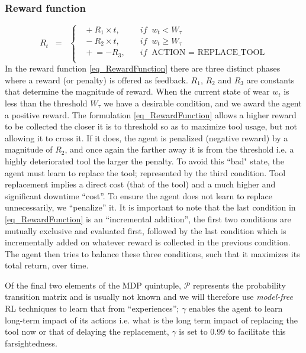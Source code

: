 \documentclass[referee, sn-mathphys-num]{sn-jnl}
\begin{document}
	\subsubsection*{Reward function}
	\begin{equation}
		R_t \;\;=\;\;
		\begin{cases}
			\;\;  +R_1 \times t, & \quad if \;\; w_t < W_\tau\\
			\;\;  -R_2 \times t, & \quad if \;\; w_t\ge W_\tau\\
			\;\; \mathrel{+}= -R_3, & \quad if \;\; \text{ACTION = REPLACE\_TOOL}\\
		\end{cases}
		\label{eq_RewardFunction}
	\end{equation}
	In the reward function \eqref{eq_RewardFunction} there are three distinct phases where a reward (or penalty) is offered as feedback. $R_1$, $R_2$ and $R_3$ are constants that determine the magnitude of reward. When the current state of wear $w_t$ is less than the threshold $W_\tau$ we have a desirable condition, and we award the agent a positive reward. The formulation {\eqref{eq_RewardFunction}} allows a higher reward to be collected the closer it is to threshold so as to maximize tool usage, but not allowing it to cross it. If it does, the agent is penalized (negative reward) by a magnitude of $R_2$, and once again the farther away it is from the threshold i.e. a highly deteriorated tool the larger the penalty. To avoid this ``bad" state, the agent must learn to replace the tool; represented by the third condition. Tool replacement implies a direct cost (that of the tool) and a much higher and significant downtime ``cost''. To ensure the agent does not learn to replace unnecessarily, we ``penalize'' it. It is important to note that the last condition in {\eqref{eq_RewardFunction}} is an ``incremental addition'', the first two conditions are mutually exclusive and evaluated first, followed by the last condition which is incrementally added on whatever reward is collected in the previous condition. The agent then tries to balance these three conditions, such that it maximizes its total return, over time.
	
	Of the final two elements of the MDP quintuple, $\mathcal{P}$ represents the probability transition matrix and is usually not known and we will therefore use \textit{model-free} RL techniques to learn that from ``experiences''; $\gamma$ enables the agent to learn long-term impact of its actions i.e. what is the long term impact of replacing the tool now or that of delaying the replacement, $\gamma$ is set to 0.99 to facilitate this farsightedness.
	
\end{document}
